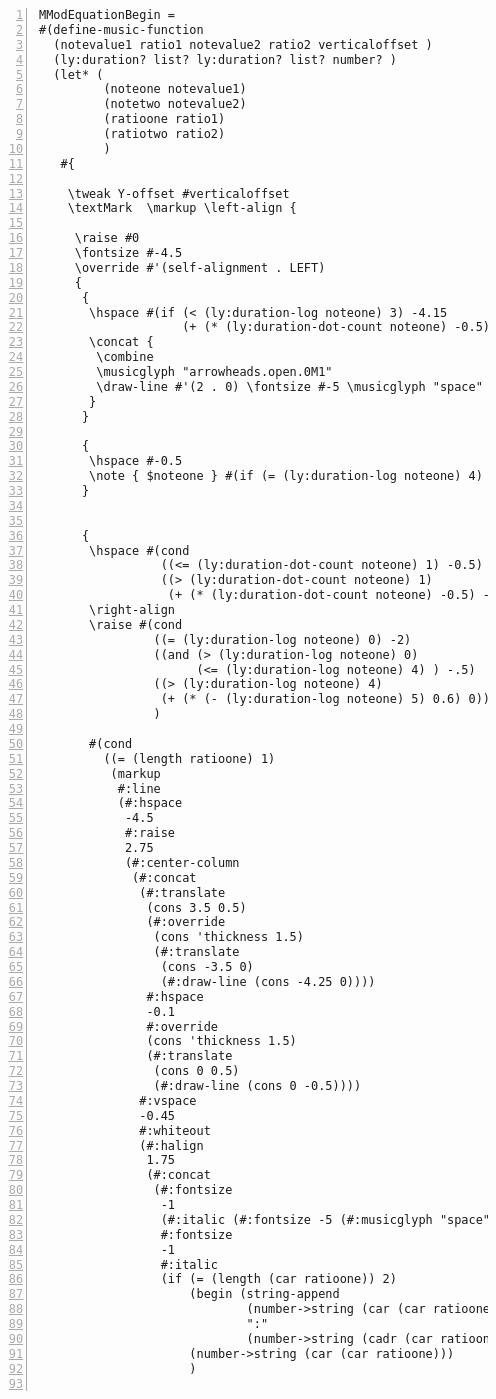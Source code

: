 \begin{Verbatim}[numbers=left,xleftmargin=5mm]
MModEquationBegin =
#(define-music-function
  (notevalue1 ratio1 notevalue2 ratio2 verticaloffset )
  (ly:duration? list? ly:duration? list? number? )
  (let* (
         (noteone notevalue1)
         (notetwo notevalue2)
         (ratioone ratio1)
         (ratiotwo ratio2)
         )
   #{

    \tweak Y-offset #verticaloffset
    \textMark  \markup \left-align {

     \raise #0
     \fontsize #-4.5
     \override #'(self-alignment . LEFT)
     {
      {
       \hspace #(if (< (ly:duration-log noteone) 3) -4.15
                    (+ (* (ly:duration-dot-count noteone) -0.5) -4.5))
       \concat {
        \combine
        \musicglyph "arrowheads.open.0M1"
        \draw-line #'(2 . 0) \fontsize #-5 \musicglyph "space"
       }
      }

      {
       \hspace #-0.5
       \note { $noteone } #(if (= (ly:duration-log noteone) 4) 1 1 )
      }


      {
       \hspace #(cond
                 ((<= (ly:duration-dot-count noteone) 1) -0.5)
                 ((> (ly:duration-dot-count noteone) 1)
                  (+ (* (ly:duration-dot-count noteone) -0.5) -0.25)))
       \right-align
       \raise #(cond
                ((= (ly:duration-log noteone) 0) -2)
                ((and (> (ly:duration-log noteone) 0)
                      (<= (ly:duration-log noteone) 4) ) -.5)
                ((> (ly:duration-log noteone) 4)
                 (+ (* (- (ly:duration-log noteone) 5) 0.6) 0))
                )

       #(cond
         ((= (length ratioone) 1)
          (markup
           #:line
           (#:hspace
            -4.5
            #:raise
            2.75
            (#:center-column
             (#:concat
              (#:translate
               (cons 3.5 0.5)
               (#:override
                (cons 'thickness 1.5)
                (#:translate
                 (cons -3.5 0)
                 (#:draw-line (cons -4.25 0))))
               #:hspace
               -0.1
               #:override
               (cons 'thickness 1.5)
               (#:translate
                (cons 0 0.5)
                (#:draw-line (cons 0 -0.5))))
              #:vspace
              -0.45
              #:whiteout
              (#:halign
               1.75
               (#:concat
                (#:fontsize
                 -1
                 (#:italic (#:fontsize -5 (#:musicglyph "space")))
                 #:fontsize
                 -1
                 #:italic
                 (if (= (length (car ratioone)) 2)
                     (begin (string-append
                             (number->string (car (car ratioone)))
                             ":"
                             (number->string (cadr (car ratioone))))  )
                     (number->string (car (car ratioone)))
                     )


\end{Verbatim}
